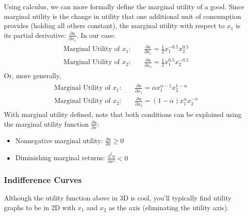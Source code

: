 \documentclass[letterpaper,10pt,english]{jupyterBook}
\begin{document}
\sphinxAtStartPar
Using calculus, we can more formally define the marginal utility of a good. Since marginal utility is the change in utility that one additional unit of consumption provides (holding all others constant), the marginal utility with respect to \(x_1\) is its partial derivative: \(\frac{\partial u}{\partial x_1}\). In our case:
\begin{equation*}
\begin{split}
\begin{aligned}
\textrm{Marginal Utility of } x_1: &\quad\frac{\partial u}{\partial x_1} = \frac{1}{2}x_1^{-0.5}x_2^{0.5} \\
\textrm{Marginal Utility of } x_2: &\quad\frac{\partial u}{\partial x_2} = \frac{1}{2}x_1^{0.5}x_2^{-0.5}
\end{aligned}
\end{split}
\end{equation*}
\sphinxAtStartPar
Or, more generally,
\begin{equation*}
\begin{split}\begin{aligned}
\textrm{Marginal Utility of } x_1: &\quad\frac{\partial u}{\partial x_1} = \alpha x_1^{\alpha-1}x_2^{1-\alpha} \\
\textrm{Marginal Utility of } x_2: &\quad\frac{\partial u}{\partial x_2} = (1-\alpha) x_1^{\alpha}x_2^{-\alpha}
\end{aligned}\end{split}
\end{equation*}
\sphinxAtStartPar
With marginal utility defined, note that both conditions can be explained using the marginal utility function \(\frac{\partial u}{\partial x}\):
\begin{itemize}
\item {} 
\sphinxAtStartPar
Non\sphinxhyphen{}negative marginal utility: \(\frac{\partial u}{\partial x} \geq 0\)

\item {} 
\sphinxAtStartPar
Diminishing marginal returns: \(\frac{\partial^2 u}{\partial x^2} < 0\)

\end{itemize}


\subsubsection{Indifference Curves}
\label{\detokenize{content/05-utility/utility:indifference-curves}}
\sphinxAtStartPar
Although the utility function above in 3D is cool, you’ll typically find utility graphs to be in 2D with \(x_1\) and \(x_2\) as the axis (eliminating the utility axis).
\end{document}
